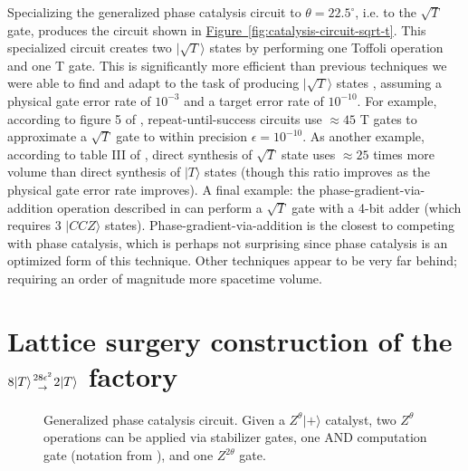 \documentclass[twocolumn,accepted=2019-03-30]{quantumarticle}
\newcommand{\fig}[1]{\hyperref[fig:#1]{Figure~\ref*{fig:#1}}}
\newcommand{\factory}[3]{$#1 \genfrac{}{}{0pt}{}{#2}{\rightarrow} {#3}$ factory}
\begin{document}
Specializing the generalized phase catalysis circuit to $\theta = 22.5^{\circ}$, i.e. to the $\sqrt{T}$ gate, produces the circuit shown in \fig{catalysis-circuit-sqrt-t}.
This specialized circuit creates two $|\sqrt{T}\rangle$ states by performing one Toffoli operation and one T gate.
This is significantly more efficient than previous techniques we were able to find and adapt to the task of producing $|\sqrt{T}\rangle$ states \cite{landahl2013complex, bocharov2014, mishra2014, kitaev2002, gidney2018, nam2018}, assuming a physical gate error rate of $10^{-3}$ and a target error rate of $10^{-10}$.
For example, according to figure 5 of \cite{bocharov2014}, repeat-until-success circuits use $\approx 45$ T gates to approximate a $\sqrt{T}$ gate to within precision $\epsilon = 10^{-10}$.
As another example, according to table III of \cite{mishra2014}, direct synthesis of $\sqrt{T}$ state uses $\approx 25$ times more volume than direct synthesis of $|T\rangle$ states (though this ratio improves as the physical gate error rate improves).
A final example: the phase-gradient-via-addition operation described in \cite{kitaev2002,gidney2018} can perform a $\sqrt{T}$ gate with a 4-bit adder (which requires 3 $|CCZ\rangle$ states).
Phase-gradient-via-addition is the closest to competing with phase catalysis, which is perhaps not surprising since phase catalysis is an optimized form of this technique.
Other techniques appear to be very far behind; requiring an order of magnitude more spacetime volume.



\section{\texorpdfstring{
Lattice surgery construction of the \factory{8|T\rangle}{28\epsilon^2}{2|T\rangle}
}{
Lattice surgery construction of the 8T to 2T factory
}}
\label{sec:full}

\begin{figure}
    \label{fig:catalysis-circuit-generalized}
    \centering
    \caption{
        Generalized phase catalysis circuit.
        Given a $Z^\theta |+\rangle$ catalyst, two $Z^\theta$ operations can be applied via stabilizer gates, one AND computation gate (notation from \cite{gidney2018}), and one $Z^{2 \theta}$ gate.
    }
\end{figure}
\end{document}
